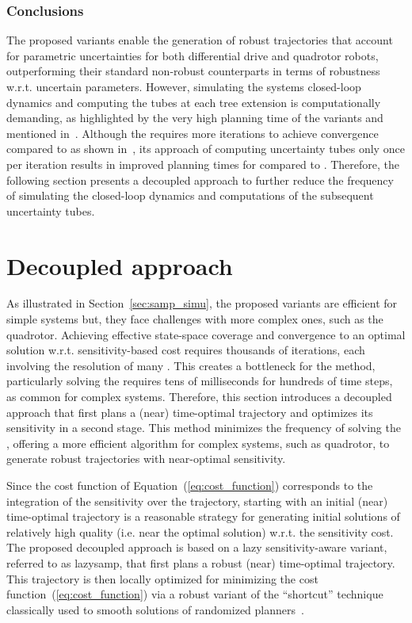 \subsubsection{Conclusions}

The proposed  variants enable the generation of robust trajectories that account for parametric uncertainties for both differential drive and quadrotor robots, outperforming their standard non-robust counterparts in terms of robustness w.r.t. uncertain parameters.
However, simulating the systems closed-loop dynamics and computing the tubes at each tree extension is computationally demanding, as highlighted by the very high planning time of the  variants and mentioned in~\cite{cTognon}.
Although the  requires more iterations to achieve convergence compared to  as shown in~\cite{cSST}, its approach of computing uncertainty tubes only once per iteration results in improved planning times for  compared to .
Therefore, the following section presents a decoupled approach to further reduce the frequency of simulating the closed-loop dynamics and computations of the subsequent uncertainty tubes.

\section{Decoupled approach}\label{sec:decoupled}

As illustrated in Section~\ref{sec:samp_simu}, the proposed  variants are efficient for simple systems but, they face challenges with more complex ones, such as the quadrotor. 
Achieving effective state-space coverage and convergence to an optimal solution w.r.t. sensitivity-based cost requires thousands of iterations, each involving the resolution of many . 
This creates a bottleneck for the method, particularly solving the  requires tens of milliseconds for hundreds of time steps, as common for complex systems.
Therefore, this section introduces a decoupled approach that first plans a (near) time-optimal trajectory and optimizes its sensitivity in a second stage.
This method minimizes the frequency of solving the , offering a more efficient algorithm for complex systems, such as quadrotor, to generate robust trajectories with near-optimal sensitivity.

Since the cost function of Equation~(\ref{eq:cost_function}) corresponds to the integration of the sensitivity over the trajectory, starting with an initial (near) time-optimal trajectory is a reasonable strategy for generating initial solutions of relatively high quality (i.e. near the optimal solution) w.r.t. the sensitivity cost.
The proposed decoupled approach is based on a lazy sensitivity-aware variant, referred to as \gls{lazysamp}, that first plans a robust (near) time-optimal trajectory.
This trajectory is then locally optimized for minimizing the cost function~(\ref{eq:cost_function}) via a robust variant of the ``shortcut'' technique classically used to smooth solutions of randomized planners~\cite{cShortcut}. 

